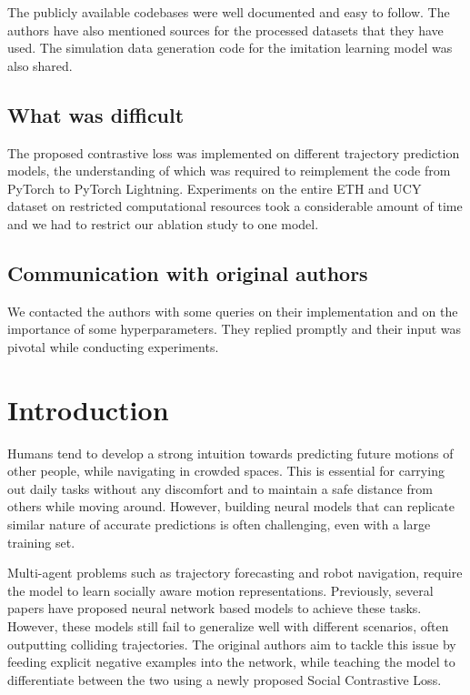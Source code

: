 The publicly available codebases were well documented and easy to follow. The authors have also mentioned sources for the processed datasets that they have used. The simulation data generation code for the imitation learning model was also shared.

\subsection*{What was difficult}

The proposed contrastive loss was implemented on different trajectory prediction models, the understanding of which was required to reimplement the code from PyTorch to PyTorch Lightning. Experiments on the entire ETH and UCY dataset on restricted computational resources took a considerable amount of time and we had to restrict our ablation study to one model.

\subsection*{Communication with original authors}
We contacted the authors with some queries on their implementation and on the importance of some hyperparameters. They replied promptly and their input was pivotal while conducting experiments.


\section{Introduction}
Humans tend to develop a strong intuition towards predicting future motions of other people, while navigating in crowded spaces. This is essential for carrying out daily tasks without any discomfort and to maintain a safe distance from others while moving around. However, building neural models that can replicate similar nature of accurate predictions is often challenging, even with a large training set.

Multi-agent problems such as trajectory forecasting and robot navigation, require the model to learn socially aware motion representations. Previously, several papers have proposed neural network based models to achieve these tasks. However, these models still fail to generalize well with different scenarios, often outputting colliding trajectories. The original authors aim to tackle this issue by feeding explicit negative examples into the network, while teaching the model to differentiate between the two using a newly proposed Social Contrastive Loss.

